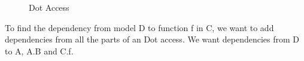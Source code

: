 \documentclass{cslthse-msc}
\begin{document}
\begin{figure}[h]
    \centering
    \qquad
    \subfloat{{}}
    \subfloat{{}}
    \caption{Dot Access}
    \label{fig:dotAccess}
\end{figure}

To find the dependency from model D to function f in C, we want to add dependencies from all the parts of an Dot access. We want dependencies from D to A, A.B and C.f.
\end{document}

